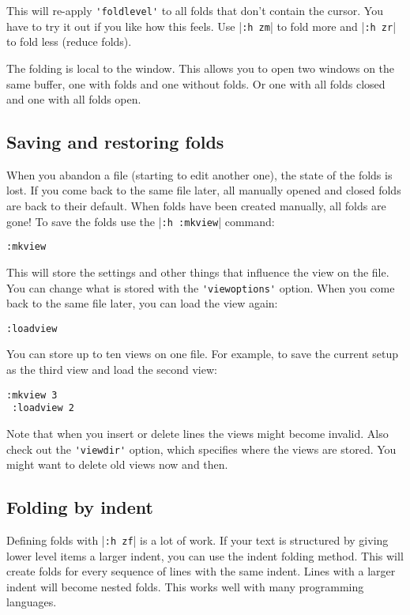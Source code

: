 This will re-apply \verb!'foldlevel'! to all folds that don't contain the cursor.
You have to try it out if you like how this feels.
Use |\verb!:h zm!| to fold more and |\verb!:h zr!| to fold less (reduce folds).

The folding is local to the window.
This allows you to open two windows on the same buffer, one with folds and one without folds.
Or one with all folds closed and one with all folds open.
\subsection{Saving and restoring folds}
When you abandon a file (starting to edit another one), the state of the folds is lost.
If you come back to the same file later, all manually opened and closed folds are back to their default.
When folds have been created manually, all folds are gone!  To save the folds use the |\verb!:h :mkview!| command:

\begin{Verbatim}[samepage=true]
 :mkview
\end{Verbatim}

This will store the settings and other things that influence the view on the file.
You can change what is stored with the \verb!'viewoptions'! option.
When you come back to the same file later, you can load the view again:

\begin{Verbatim}[samepage=true]
 :loadview
\end{Verbatim}

You can store up to ten views on one file.
For example, to save the current setup as the third view and load the second view:

\begin{Verbatim}[samepage=true]
 :mkview 3
 :loadview 2
\end{Verbatim}

Note that when you insert or delete lines the views might become invalid.
Also check out the \verb!'viewdir'! option, which specifies where the views are stored.
You might want to delete old views now and then.
\subsection{Folding by indent}
Defining folds with |\verb!:h zf!| is a lot of work.
If your text is structured by giving lower level items a larger indent, you can use the indent folding method.
This will create folds for every sequence of lines with the same indent.
Lines with a larger indent will become nested folds.
This works well with many programming languages.

